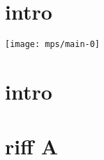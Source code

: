 \documentclass[11pt]{article}
\begin{document}
    \begin{center}
    \end{center}
    \section*{intro}
    \texttt{[image: mps/main-0]}


    \section{intro}
    

    \section{riff A}
    

    \newpage
    




%    


%    
\end{document}
